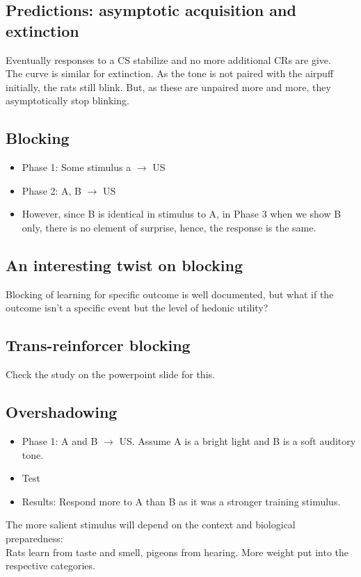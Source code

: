 \subsection{Predictions: asymptotic acquisition and extinction}
Eventually responses to a CS stabilize and no more additional CRs are give.
\\The curve is similar for extinction. As the tone is not paired with the airpuff initially, the rats still blink. But, as these are unpaired more and more, they asymptotically stop blinking.

\subsection{Blocking}
\begin{itemize}
    \item Phase 1: Some stimulus a $\rightarrow$ US
    \item Phase 2: A, B $\rightarrow$ US
    \item However, since B is identical in stimulus to A, in Phase 3 when we show B only, there is no element of surprise, hence, the response is the same.
\end{itemize}
\subsection{An interesting twist on blocking}
Blocking of learning for specific outcome is well documented, but what if the outcome isn't a specific event but the level of hedonic utility?

\subsection{Trans-reinforcer blocking}
Check the study on the powerpoint slide for this.

\subsection{Overshadowing}
\begin{itemize}
    \item Phase 1: A and B $\rightarrow$ US. Assume A is a bright light and B is a soft auditory tone.
    \item Test
    \item Results: Respond more to A than B as it was a stronger training stimulus.
\end{itemize}
The more salient stimulus will depend on the context and biological preparedness: 
\\Rats learn from taste and smell, pigeons from hearing. More weight put into the respective categories.

